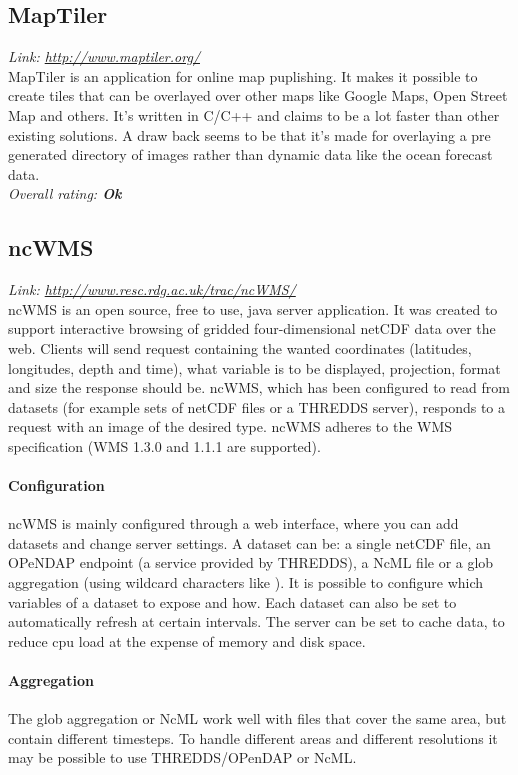 \documentclass[11pt,a4paper,titlepage,oneside]{report}
\begin{document}
  \subsection{MapTiler}
  \emph{Link: \url{http://www.maptiler.org/}} \\%
    MapTiler is an application for online map puplishing. It makes it possible to create tiles that can be overlayed over other maps like Google Maps, Open Street Map and others. It's written in C/C++ and claims to be a lot faster than other existing solutions. A draw back seems to be that it's made for overlaying a pre generated directory of images rather than dynamic data like the ocean forecast data.
  \\ \emph{Overall rating: \textbf{Ok}}
  
    \subsection{ncWMS}
  \emph{Link: \url{http://www.resc.rdg.ac.uk/trac/ncWMS/}} \\%
    ncWMS is an open source, free to use, java server application. It was created to support interactive browsing of gridded four-dimensional netCDF data over the web. Clients will send request containing the wanted coordinates (latitudes, longitudes, depth and time), what variable is to be displayed, projection, format and size the response should be. ncWMS, which has been configured to read from datasets (for example sets of netCDF files or a THREDDS server), responds to a request with an image of the desired type. ncWMS adheres to the WMS specification (WMS 1.3.0 and 1.1.1 are supported).
    \paragraph{Configuration}
    ncWMS is mainly configured through a web interface, where you can add datasets and change server settings. A dataset can be: a single netCDF file, an OPeNDAP endpoint (a service provided by THREDDS), a NcML file or a glob aggregation (using wildcard characters like ). It is possible to configure which variables of a dataset to expose and how. Each dataset can also be set to automatically refresh at certain intervals. The server can be set to cache data, to reduce cpu load at the expense of memory and disk space.
    \paragraph{Aggregation}
    The glob aggregation or NcML work well with files that cover the same area, but contain different timesteps. To handle different areas and different resolutions it may be possible to use THREDDS/OPenDAP or NcML.
\end{document}
